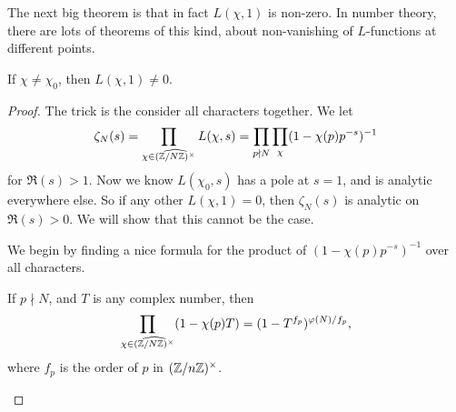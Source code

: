 \documentclass[a4paper]{article}
\begin{document}
The next big theorem is that in fact $L(\chi, 1)$ is non-zero. In number theory, there are lots of theorems of this kind, about non-vanishing of $L$-functions at different points.
\begin{thm}
  If $\chi \not= \chi_0$, then $L(\chi, 1) \not= 0$.
\end{thm}

\begin{proof}
  The trick is the consider all characters together. We let
  \[
    \zeta_N(s) = \prod_{\chi \in \widehat{(\mathbb{Z}/N\mathbb{Z})^\times}} L(\chi, s) = \prod_{p \nmid N} \prod_\chi (1 - \chi(p) p^{-s})^{-1}
  \]
  for $\Re(s) > 1$. Now we know $L(\chi_0, s)$ has a pole at $s = 1$, and is analytic everywhere else. So if any other $L(\chi, 1) = 0$, then $\zeta_N(s)$ is analytic on $\Re(s) > 0$. We will show that this cannot be the case.

  We begin by finding a nice formula for the product of $(1 - \chi(p) p^{-s})^{-1}$ over all characters.
  \begin{claim}
    If $p \nmid N$, and $T$ is any complex number, then
    \[
      \prod_{\chi \in \widehat{(\mathbb{Z}/N\mathbb{Z})^\times}} (1 - \chi(p) T) = (1 - T^{f_p})^{\varphi(N)/f_p},
    \]
    where $f_p$ is the order of $p$ in $(\mathbb{Z}/n\mathbb{Z})^\times$.


\end{claim}
\end{proof}
\end{document}
